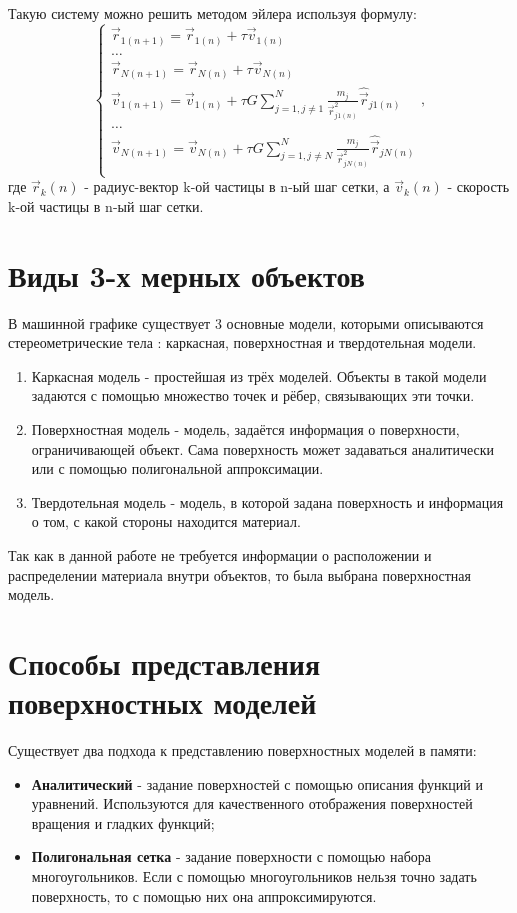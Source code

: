 Такую систему можно решить методом эйлера используя формулу:
\begin{equation}
	\label{n_euler_velocities}
	\begin{cases}
		\vec{r}_{1(n+1)} = \vec{r}_{1(n)} + \tau \vec{v}_{1(n)} \\
		\dots \\
		\vec{r}_{N(n+1)} = \vec{r}_{N(n)} + \tau \vec{v}_{N(n)} \\
		
		
		\vec{v}_{1(n+1)} = \vec{v}_{1(n)} + \tau G\sum_{j=1, j \neq 1}^{N}{\frac{m_j}{\vec{r}_{j1(n)}^2}\hat{\vec{r}}_{j1(n)}} \\
		\dots \\
		\vec{v}_{N(n+1)} = \vec{v}_{N(n)} + \tau G\sum_{j=1, j \neq N}^{N}{\frac{m_j}{\vec{r}_{jN(n)}^2}\hat{\vec{r}}_{jN(n)}} \\
	\end{cases},
\end{equation}
где $\vec{r}_k(n)$ - радиус-вектор k-ой частицы в n-ый шаг сетки, а $\vec{v}_k(n)$ - скорость k-ой частицы в n-ый шаг сетки.

\section{Виды 3-х мерных объектов}
В машинной графике существует 3 основные модели, которыми описываются стереометрические тела \cite{rodgers}: каркасная, поверхностная и твердотельная модели.

\begin{enumerate}
	\item Каркасная модель - простейшая из трёх моделей. Объекты в такой модели задаются с помощью множество точек и рёбер, связывающих эти точки.
	\item Поверхностная модель - модель, задаётся информация о поверхности, ограничивающей объект. Сама поверхность может задаваться аналитически или с помощью полигональной аппроксимации.
	\item Твердотельная модель - модель, в которой задана поверхность и информация о том, с какой стороны находится материал.
\end{enumerate}

Так как в данной работе не требуется информации о расположении и распределении материала внутри объектов, то была выбрана поверхностная модель.

\section{Способы представления поверхностных моделей}
Существует два подхода к представлению поверхностных моделей в памяти:
\begin{itemize}
	\item \textbf{Аналитический} - задание поверхностей с помощью описания функций и уравнений. Используются для качественного отображения поверхностей вращения и гладких функций;
	\item \textbf{Полигональная сетка} - задание поверхности с помощью набора многоугольников. Если с помощью многоугольников нельзя точно задать поверхность, то с помощью них она аппроксимируются.
\end{itemize}

